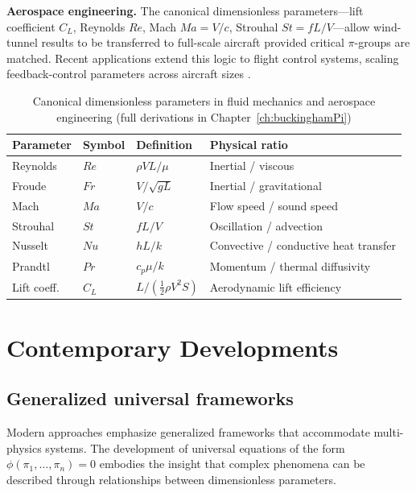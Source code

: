 \textbf{Aerospace engineering.} The canonical dimensionless parameters—lift coefficient \(C_L\), Reynolds \(Re\), Mach \(Ma = V/c\), Strouhal \(St = fL/V\)—allow wind-tunnel results to be transferred to full-scale aircraft provided critical \(\pi\)-groups are matched. Recent applications extend this logic to flight control systems, scaling feedback-control parameters across aircraft sizes \cite{white2011}.

\begin{table}[ht]
\centering
\caption{Canonical dimensionless parameters in fluid mechanics and aerospace engineering (full derivations in Chapter~\ref{ch:buckinghamPi})}
\label{tab:ch2_dimless}
\renewcommand{\arraystretch}{1.4}
\begin{tabular}{llll}
\hline
\textbf{Parameter} & \textbf{Symbol} & \textbf{Definition} & \textbf{Physical ratio} \\
\hline
Reynolds   & \(Re\) & \(\rho V L/\mu\)       & Inertial / viscous \\
Froude     & \(Fr\) & \(V/\!\sqrt{gL}\)       & Inertial / gravitational \\
Mach       & \(Ma\) & \(V/c\)                 & Flow speed / sound speed \\
Strouhal   & \(St\) & \(fL/V\)                & Oscillation / advection \\
Nusselt    & \(Nu\) & \(hL/k\)                & Convective / conductive heat transfer \\
Prandtl    & \(Pr\) & \(c_p\mu/k\)            & Momentum / thermal diffusivity \\
Lift coeff.& \(C_L\)& \(L/(\tfrac{1}{2}\rho V^{2}S)\) & Aerodynamic lift efficiency \\
\hline
\end{tabular}
\end{table}

\section{Contemporary Developments}\label{ch02:ContemporaryDevelopments}

\subsection{Generalized universal frameworks}

Modern approaches emphasize generalized frameworks that accommodate multi-physics systems. The development of universal equations of the form \(\phi(\pi_1,\dots,\pi_n)=0\) embodies the insight that complex phenomena can be described through relationships between dimensionless parameters.

